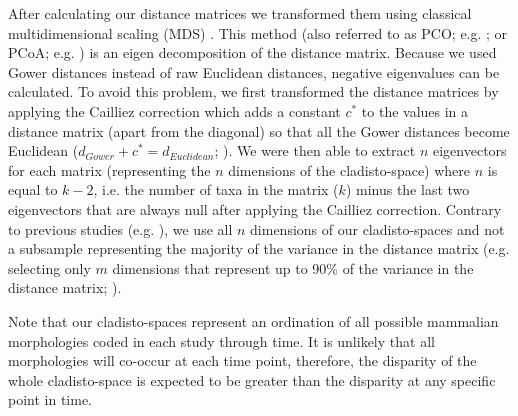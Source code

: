 \documentclass[10pt,letterpaper]{article}
\begin{document}
After calculating our distance matrices we transformed them using classical multidimensional scaling (MDS) \cite{torgerson1965multidimensional,GOWER01121966,cailliez1983analytical}.
This method (also referred to as PCO; e.g. \cite{Brusatte2015}; or PCoA; e.g. \cite{paradisape:2004}) is an eigen decomposition of the distance matrix.
Because we used Gower distances instead of raw Euclidean distances, negative eigenvalues can be calculated.
To avoid this problem, we first transformed the distance matrices by applying the Cailliez correction \cite{cailliez1983analytical} which adds a constant $c^*$ to the values in a distance matrix (apart from the diagonal) so that all the Gower distances become Euclidean ($d_{Gower}+c^*=d_{Euclidean}$; \cite{cailliez1983analytical}). 
We were then able to extract $n$ eigenvectors for each matrix (representing the $n$ dimensions of the cladisto-space) where $n$ is equal to $k-2$, i.e. the number of taxa in the matrix ($k$) minus the last two eigenvectors that are always null after applying the Cailliez correction.
Contrary to previous studies (e.g. \cite{brusatte50,cisneros2010,prentice2011,anderson2012using,Hughes20082013,bentonmodels2014}), we use all $n$ dimensions of our cladisto-spaces and not a subsample representing the majority of the variance in the distance matrix (e.g. selecting only $m$ dimensions that represent up to 90\% of the variance in the distance matrix; \cite{Brusatte12092008,toljagictriassic-jurassic2013}).

Note that our cladisto-spaces represent an ordination of all possible mammalian morphologies coded in each study through time.
It is unlikely that all morphologies will co-occur at each time point, therefore, the disparity of the whole cladisto-space is expected to be greater than the disparity at any specific point in time.
\end{document}
